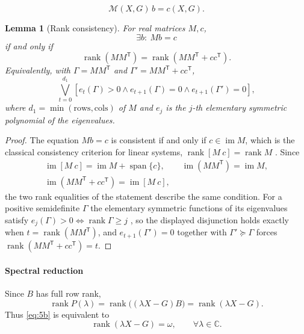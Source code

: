 \documentclass[journal]{IEEEtran}
\theoremstyle{plainn}
\newtheorem{lem}[thm]{Lemma}
\theoremstyle{remark}
\begin{document}
\begin{equation*}
\mathcal M(X,G)\,b=c(X,G).
\end{equation*}

\begin{lem}[Rank consistency]\label{lem:rankcons}
For real matrices $M,c$,
\begin{equation*}
\exists b:\ Mb=c
\end{equation*}
if and only if
\begin{equation*}
\operatorname{rank}(MM^{\mathsf T})
=\operatorname{rank}(MM^{\mathsf T}+cc^{\mathsf T}).
\end{equation*}
Equivalently, with $\Gamma=MM^{\mathsf T}$ and
$\Gamma'=MM^{\mathsf T}+cc^{\mathsf T}$,
\begin{equation*}
\bigvee_{t=0}^{d_1}
\left[e_t(\Gamma)>0\wedge e_{t+1}(\Gamma)=0\wedge e_{t+1}(\Gamma')=0\right],
\end{equation*}
where $d_1=\min(\text{rows},\text{cols})$ of $M$ and $e_j$ is the
$j$-th elementary symmetric polynomial of the eigenvalues.
\end{lem}

\begin{proof}
The equation $Mb=c$ is consistent if and only if $c\in\operatorname{im}M$, which is the classical
consistency criterion for linear systems, $\operatorname{rank}[M\ c]=\operatorname{rank}M$
\cite[Ch.~0]{hj13}. Since
\begin{equation*}
\begin{gathered}
\operatorname{im}[M\ c]=\operatorname{im}M+\operatorname{span}\{c\},\qquad
\operatorname{im}(MM^{\mathsf T})=\operatorname{im}M,\\
\operatorname{im}(MM^{\mathsf T}+cc^{\mathsf T})=\operatorname{im}[M\ c],
\end{gathered}
\end{equation*}
the two rank equalities of the statement describe the same condition. For a positive semidefinite
$\Gamma$ the elementary symmetric functions of its eigenvalues satisfy
$e_j(\Gamma)>0\iff\operatorname{rank}\Gamma\ge j$ \cite[Ch.~4]{hj13}, so the displayed disjunction
holds exactly when $t=\operatorname{rank}(MM^{\mathsf T})$, and
$e_{t+1}(\Gamma')=0$ together with $\Gamma'\succeq\Gamma$ forces
$\operatorname{rank}(MM^{\mathsf T}+cc^{\mathsf T})=t$.
\end{proof}

\paragraph*{Spectral reduction}\label{sec:spectral}
Since $B$ has full row rank,
\begin{equation*}
\operatorname{rank}P(\lambda)
=\operatorname{rank}\bigl((\lambda X-G)B\bigr)
=\operatorname{rank}(\lambda X-G).
\end{equation*}
Thus \eqref{eq:5b} is equivalent to
\begin{equation*}
\operatorname{rank}(\lambda X-G)=\omega,\qquad\forall\lambda\in\mathbb C .
\end{equation*}
\end{document}

